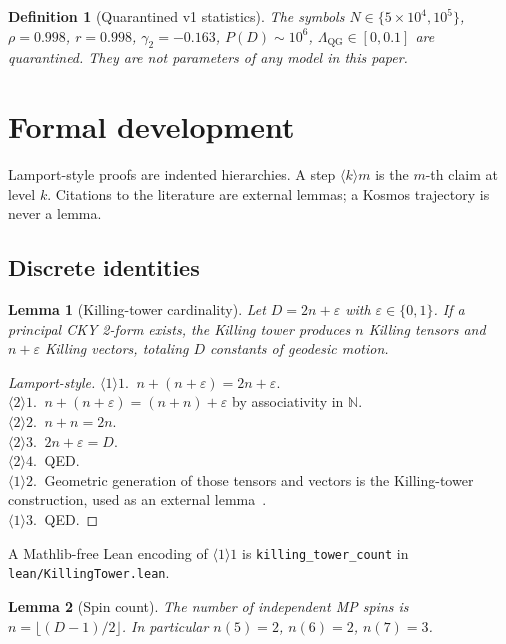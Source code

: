 \documentclass[11pt,a4paper]{article}
\newtheorem{definition}{Definition}[section]
\newtheorem{lemma}{Lemma}[section]
\begin{document}
\begin{definition}[Quarantined v1 statistics]
The symbols \(N\in\{5\times10^4,10^5\}\), \(\rho=0.998\), \(r=0.998\),
\(\gamma_2=-0.163\), \(P(D)\sim10^6\), \(\Lambda_{\mathrm{QG}}\in[0,0.1]\)
are \emph{quarantined}. They are not parameters of any model in this
paper.
\end{definition}

\section{Formal development}

Lamport-style proofs are indented hierarchies. A step \(\langle k\rangle m\)
is the \(m\)-th claim at level \(k\). Citations to the literature are
external lemmas; a Kosmos trajectory is never a lemma.

\subsection{Discrete identities}

\begin{lemma}[Killing-tower cardinality]
\label{lem:tower}
Let \(D=2n+\varepsilon\) with \(\varepsilon\in\{0,1\}\). If a principal
CKY 2-form exists, the Killing tower produces \(n\) Killing tensors and
\(n+\varepsilon\) Killing vectors, totaling \(D\) constants of geodesic
motion.
\end{lemma}

\begin{proof}[Lamport-style]
\(\langle1\rangle1.\ \) \(n+(n+\varepsilon)=2n+\varepsilon\).\\
\quad\(\langle2\rangle1.\ \) \(n+(n+\varepsilon)=(n+n)+\varepsilon\) by
associativity in \(\mathbb{N}\).\\
\quad\(\langle2\rangle2.\ \) \(n+n=2n\).\\
\quad\(\langle2\rangle3.\ \) \(2n+\varepsilon=D\).\\
\quad\(\langle2\rangle4.\ \) QED.\\
\(\langle1\rangle2.\ \) Geometric generation of those tensors and
vectors is the Killing-tower construction, used as an external
lemma~\cite{Krtousetal2007}.\\
\(\langle1\rangle3.\ \) QED.
\end{proof}

A Mathlib-free Lean encoding of \(\langle1\rangle1\) is
\texttt{killing\_tower\_count} in \texttt{lean/KillingTower.lean}.

\begin{lemma}[Spin count]
\label{lem:nspins}
The number of independent MP spins is \(n=\lfloor(D-1)/2\rfloor\).
In particular \(n(5)=2\), \(n(6)=2\), \(n(7)=3\).
\end{lemma}
\end{document}
